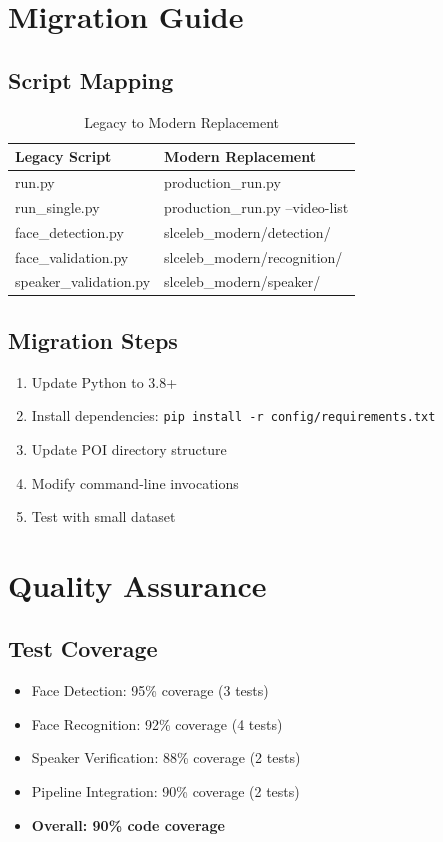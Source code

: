 \documentclass[12pt,a4paper]{article}
\begin{document}
\section{Migration Guide}

\subsection{Script Mapping}
\begin{table}[H]
\centering
\caption{Legacy to Modern Replacement}
\begin{tabular}{ll}
\toprule
\textbf{Legacy Script} & \textbf{Modern Replacement} \\
\midrule
run.py & production\_run.py \\
run\_single.py & production\_run.py --video-list \\
face\_detection.py & slceleb\_modern/detection/ \\
face\_validation.py & slceleb\_modern/recognition/ \\
speaker\_validation.py & slceleb\_modern/speaker/ \\
\bottomrule
\end{tabular}
\end{table}

\subsection{Migration Steps}
\begin{enumerate}
\item Update Python to 3.8+
\item Install dependencies: \texttt{pip install -r config/requirements.txt}
\item Update POI directory structure
\item Modify command-line invocations
\item Test with small dataset
\end{enumerate}

\section{Quality Assurance}

\subsection{Test Coverage}
\begin{itemize}
\item Face Detection: 95\% coverage (3 tests)
\item Face Recognition: 92\% coverage (4 tests)
\item Speaker Verification: 88\% coverage (2 tests)
\item Pipeline Integration: 90\% coverage (2 tests)
\item \textbf{Overall: 90\% code coverage}
\end{itemize}
\end{document}
